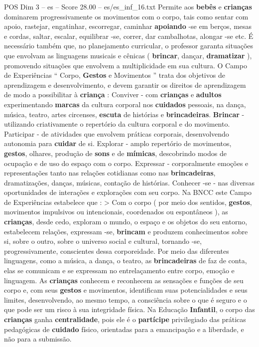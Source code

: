 \begin{textsample}{POS Dim 3 – es – Score 28.00 – es/es\_inf\_16.txt}
Permite aos \textbf{bebês} e \textbf{crianças} dominarem progressivamente os movimentos com o corpo, tais como sentar com apoio, rastejar, engatinhar, escorregar, caminhar \textbf{apoiando} -se em berços, mesas e cordas, saltar, escalar, equilibrar -se, correr, dar cambalhotas, alongar -se etc.
É necessário também que, no planejamento curricular, o professor garanta situações que envolvam as linguagens musicais e cênicas ( \textbf{brincar}, dançar, \textbf{dramatizar} ), promovendo situações que envolvem a multiplicidade em sua cultura.
O Campo de Experiências “ Corpo, \textbf{Gestos} e Movimentos ” trata dos objetivos de aprendizagem e desenvolvimento, e devem garantir os direitos de aprendizagem de modo a possibilitar à \textbf{criança} : Conviver - com \textbf{crianças} e \textbf{adultos} experimentando \textbf{marcas} da cultura corporal nos \textbf{cuidados} pessoais, na dança, música, teatro, artes circenses, \textbf{escuta} de histórias e \textbf{brincadeiras}. \textbf{Brincar} - utilizando criativamente o repertório da cultura corporal e do movimento.
Participar - de atividades que envolvem práticas corporais, desenvolvendo autonomia para \textbf{cuidar} de si.
Explorar - amplo repertório de movimentos, \textbf{gestos}, olhares, produção de \textbf{sons} e de \textbf{mímicas}, descobrindo modos de ocupação e de uso do espaço com o corpo.
Expressar - corporalmente emoções e representações tanto nas relações cotidianas como nas \textbf{brincadeiras}, dramatizações, danças, músicas, contação de histórias.
Conhecer -se - nas diversas oportunidades de interações e explorações com seu corpo.
Na BNCC este Campo de Experiências estabelece que : > Com o corpo ( por meio dos sentidos, \textbf{gestos}, movimentos impulsivos ou intencionais, coordenados ou espontâneos ), as \textbf{crianças}, desde cedo, exploram o mundo, o espaço e os objetos do seu entorno, estabelecem relações, expressam -se, \textbf{brincam} e produzem conhecimentos sobre si, sobre o outro, sobre o universo social e cultural, tornando -se, progressivamente, conscientes dessa corporeidade.
Por meio das diferentes linguagens, como a música, a dança, o teatro, as \textbf{brincadeiras} de faz de conta, elas se comunicam e se expressam no entrelaçamento entre corpo, emoção e linguagem.
As \textbf{crianças} conhecem e reconhecem as sensações e funções de seu corpo e, com seus \textbf{gestos} e movimentos, identificam suas potencialidades e seus limites, desenvolvendo, ao mesmo tempo, a consciência sobre o que é seguro e o que pode ser um risco à sua integridade física.
Na Educação \textbf{Infantil}, o corpo das \textbf{crianças} ganha \textbf{centralidade}, pois ele é o \textbf{partícipe} privilegiado das práticas pedagógicas de \textbf{cuidado} físico, orientadas para a emancipação e a liberdade, e não para a submissão.

\end{textsample}
